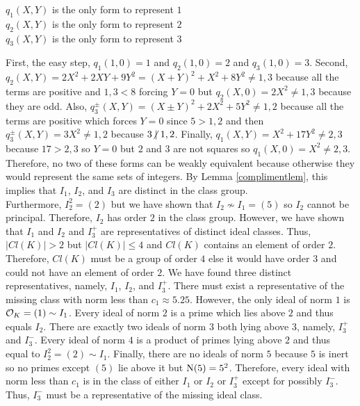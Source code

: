 \documentclass[12pt]{extarticle}
\begin{document}
\begin{enumerate}
\begin{enumerate}
\begin{center}
$q_1(X, Y)$ is the only form to represent $1$ \\
$q_2(X, Y)$ is the only form to represent $2$ \\
$q_3(X, Y)$ is the only form to represent $3$ \\
\end{center}
First, the easy step, $q_1(1,0) = 1$ and $q_2(1, 0) = 2$ and $q_3(1, 0) = 3$. Second,  
$q_2(X, Y) = 2 X^2 + 2 XY + 9 Y^2 = (X + Y)^2 + X^2 + 8 Y^2 \neq 1, 3$ because all the terms are positive and $1, 3 < 8$ forcing $Y = 0$ but $q_2(X, 0) = 2 X^2 \neq 1, 3$ because they are odd. Also, $q_3^{\pm}(X, Y) = (X \pm Y)^2 + 2 X^2 + 5 Y^2 \neq 1, 2$ because all the terms are positive which forces $Y = 0$ since $5 > 1, 2$ and then $q_3^{\pm}(X, Y) = 3 X^2 \neq 1, 2$ because $3 \ndivides 1, 2$. Finally, $q_1(X, Y) = X^2 + 17 Y^2 \neq 2, 3$ because $17 > 2,3$ so $Y = 0$ but $2$ and $3$ are not squares so $q_1(X, 0) = X^2 \neq 2, 3$. Therefore, no two of these forms can be weakly equivalent because otherwise they would represent the same sets of integers. By Lemma \ref{complimentlem}, this implies that $I_1$, $I_2$, and $I_3$ are distinct in the class group. \bigskip \\
Furthermore, $I_2^2 = (2)$ but we have shown that $I_2 \not\sim I_1 = (5)$ so $I_2$ cannot be principal. Therefore, $I_2$ has order $2$ in the class group. However, we have shown that $I_1$ and $I_2$ and $I_3^{+}$ are representatives of distinct ideal classes. Thus, $|Cl(K)| > 2$ but $|Cl(K)| \le 4$ and $Cl(K)$ contains an element of order $2$. Therefore, $Cl(K)$ must be a group of order $4$ else it would have order $3$ and could not have an element of order $2$. We have found three distinct representatives, namely, $I_1$, $I_2$, and $I_3^{+}$. There must exist a representative of the missing class with norm less than $c_1 \approx 5.25$. However, the only ideal of norm $1$ is $\mathcal{O}_{K} = (1) \sim I_1$. Every ideal of norm $2$ is a prime which lies above $2$ and thus equals $I_2$. There are exactly two ideals of norm $3$ both lying above $3$, namely, $I_3^{+}$ and $I_3^{-}$. Every ideal of norm $4$ is a product of primes lying above $2$ and thus equal to $I_2^2 = (2) \sim I_1$. Finally, there are no ideals of norm $5$ because $5$ is inert so no primes except $(5)$ lie above it but $\mathrm{N}(5) = 5^2$. Therefore, every ideal with norm less than $c_1$ is in the class of either $I_1$ or $I_2$ or $I_3^{+}$ except for possibly $I_3^{-}$. Thus, $I_3^{-}$ must be a representative of the missing ideal class.       


\end{enumerate}
\end{enumerate}
\end{document}
